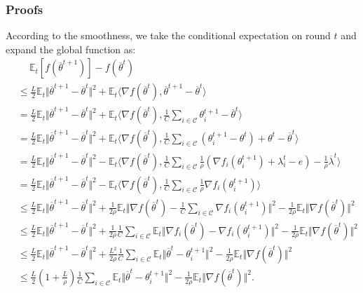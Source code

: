 \subsubsection{Proofs}
According to the smoothness, we take the conditional expectation on round $t$ and expand the global function as:
\begin{align*}
    &\quad \ \mathbb{E}_t\left[f(\overline{\theta}^{t+1})\right] - f(\overline{\theta}^{t})\\
    &\leq \frac{L}{2}\mathbb{E}_t\Vert\overline{\theta}^{t+1} - \overline{\theta}^{t} \Vert^2 + \mathbb{E}_t\langle\nabla f(\overline{\theta}^{t}), \overline{\theta}^{t+1} - \overline{\theta}^{t}\rangle\\
    &= \frac{L}{2}\mathbb{E}_t\Vert\overline{\theta}^{t+1} - \overline{\theta}^{t} \Vert^2 + \mathbb{E}_t\langle\nabla f(\overline{\theta}^{t}), \frac{1}{C}\sum_{i\in\mathcal{C}}\theta_i^{t+1} - \overline{\theta}^{t}\rangle\\
    &= \frac{L}{2}\mathbb{E}_t\Vert\overline{\theta}^{t+1} - \overline{\theta}^{t} \Vert^2 + \mathbb{E}_t\langle\nabla f(\overline{\theta}^{t}), \frac{1}{C}\sum_{i\in\mathcal{C}}\left(\theta_i^{t+1} - \theta^t\right) + \theta^t - \overline{\theta}^{t}\rangle\\
    &= \frac{L}{2}\mathbb{E}_t\Vert\overline{\theta}^{t+1} - \overline{\theta}^{t} \Vert^2 - \mathbb{E}_t\langle\nabla f(\overline{\theta}^{t}), \frac{1}{C}\sum_{i\in\mathcal{C}}\frac{1}{\rho}\left(\nabla f_i(\theta_i^{t+1}) + \lambda_i^t - e\right) - \frac{1}{\rho}\overline{\lambda}^t\rangle\\
    &= \frac{L}{2}\mathbb{E}_t\Vert\overline{\theta}^{t+1} - \overline{\theta}^{t} \Vert^2 - \mathbb{E}_t\langle\nabla f(\overline{\theta}^{t}), \frac{1}{C}\sum_{i\in\mathcal{C}}\frac{1}{\rho}\nabla f_i(\theta_i^{t+1})\rangle\\  
    &\leq \frac{L}{2}\mathbb{E}_t\Vert\overline{\theta}^{t+1} - \overline{\theta}^{t} \Vert^2 + \frac{1}{2\rho}\mathbb{E}_t\Vert \nabla f(\overline{\theta}^{t}) - \frac{1}{C}\sum_{i\in\mathcal{C}}\nabla f_i(\theta_i^{t+1})\Vert^2 - \frac{1}{2\rho}\mathbb{E}_t\Vert \nabla f(\overline{\theta}^{t})\Vert^2\\
    &\leq \frac{L}{2}\mathbb{E}_t\Vert\overline{\theta}^{t+1} - \overline{\theta}^{t} \Vert^2 + \frac{1}{2\rho}\frac{1}{C}\sum_{i\in\mathcal{C}}\mathbb{E}_t\Vert \nabla f_i(\overline{\theta}^{t}) - \nabla f_i(\theta_i^{t+1})\Vert^2 - \frac{1}{2\rho}\mathbb{E}_t\Vert \nabla f(\overline{\theta}^{t})\Vert^2\\
    &\leq \frac{L}{2}\mathbb{E}_t\Vert\overline{\theta}^{t+1} - \overline{\theta}^{t} \Vert^2 + \frac{L^2}{2\rho}\frac{1}{C}\sum_{i\in\mathcal{C}}\mathbb{E}_t\Vert \overline{\theta}^{t} - \theta_i^{t+1}\Vert^2 - \frac{1}{2\rho}\mathbb{E}_t\Vert \nabla f(\overline{\theta}^{t})\Vert^2\\
    &\leq \frac{L}{2}\left(1+\frac{L}{\rho}\right)\frac{1}{C}\sum_{i\in\mathcal{C}}\mathbb{E}_t\Vert \overline{\theta}^{t} - \theta_i^{t+1}\Vert^2 - \frac{1}{2\rho}\mathbb{E}_t\Vert \nabla f(\overline{\theta}^{t})\Vert^2.
\end{align*}
